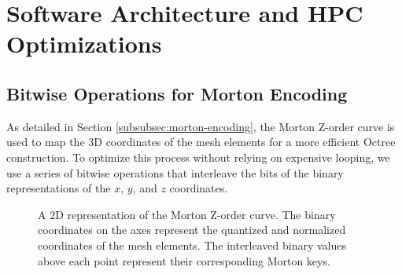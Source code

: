 \chapter{Software Architecture and HPC Optimizations}\label{chapter:software-arch-and-hpc-optimizations}



\section{Bitwise Operations for Morton Encoding} \label{sec:bitwise-operations-for-morton-encoding}
As detailed in Section \ref{subsubsec:morton-encoding}, the Morton Z-order curve is used to map the 3D coordinates of the mesh elements for a more efficient Octree construction. To optimize this process without relying on expensive looping, we use a series of bitwise operations that interleave the bits of the binary representations of the $x$, $y$, and $z$ coordinates.

\begin{figure}
    \centering
    
    \caption{A 2D representation of the Morton Z-order curve. The binary coordinates on the axes represent the quantized and normalized coordinates of the mesh elements. The interleaved binary values above each point represent their corresponding Morton keys.}
    \label{fig:z-order-curve}
\end{figure}

